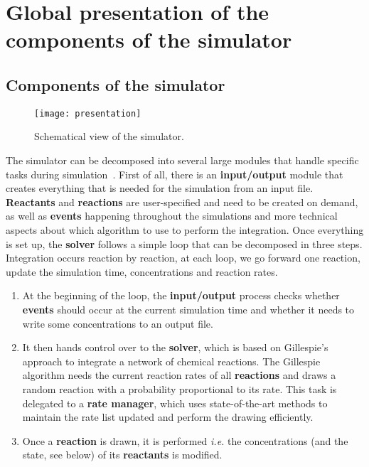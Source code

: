\graphicspath{{\relativepath/figures/}}

\section{Global presentation of the components of the simulator}
\subsection{Components of the simulator}

\begin{figure}[!ht]
        \centering
        \texttt{[image: presentation]}
	\caption{Schematical view of the simulator.}
	\label{fig:presentation}
\end{figure}

The simulator can be decomposed into several large modules that handle specific tasks during simulation~. First of all, there is an \textbf{input/output} module that creates everything that is needed for the simulation from an input file. \textbf{Reactants} and \textbf{reactions} are user-specified and need to be created on demand, as well as \textbf{events} happening throughout the simulations and more technical aspects about which algorithm to use to perform the integration. Once everything is set up, the \textbf{solver} follows a simple loop that can be decomposed in three steps. Integration occurs reaction by reaction, at each loop, we go forward one reaction, update the simulation time, concentrations and reaction rates.

\begin{enumerate}
	\item At the beginning of the loop, the \textbf{input/output} process checks whether \textbf{events} should occur at the current simulation time and whether it needs to write some concentrations to an output file.
	\item It then hands control over to the \textbf{solver}, which is based on Gillespie's approach to integrate a network of chemical reactions. The Gillespie algorithm needs the current reaction rates of all \textbf{reactions} and draws a random reaction with a probability proportional to its rate. This task is delegated to a \textbf{rate manager}, which uses state-of-the-art methods to maintain the rate list updated and perform the drawing efficiently.
	\item Once a \textbf{reaction} is drawn, it is performed \textit{i.e.} the concentrations (and the state, see below) of its \textbf{reactants} is modified.
\end{enumerate}









